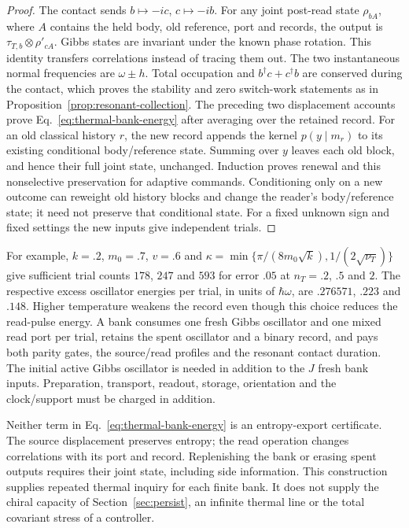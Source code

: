 \documentclass[aps,pre,onecolumn,superscriptaddress,floatfix,longbibliography]{revtex4-2}
\begin{document}
\begin{proof}
The contact sends $b\mapsto-ic$, $c\mapsto-ib$.
For any joint post-read state $\rho_{bA}$, where $A$ contains the held
body, old reference, port and records, the output is
$\tau_{T,b}\otimes\rho'_{cA}$. Gibbs states are invariant under the known
phase rotation. This identity transfers correlations instead of tracing
them out. The two instantaneous normal frequencies are $\omega\pm h$.
Total occupation and $b^\dagger c+c^\dagger b$ are conserved during the
contact, which proves the stability and zero switch-work statements as in
Proposition~\ref{prop:resonant-collection}. The preceding two displacement
accounts prove Eq.~\eqref{eq:thermal-bank-energy} after averaging over
the retained record. For an old classical history $r$, the new record
appends the kernel $p(y\mid m_r)$ to its existing conditional
body/reference state. Summing over $y$ leaves each old block, and hence
their full joint state, unchanged. Induction proves renewal and this
nonselective preservation for adaptive commands. Conditioning only on a
new outcome can reweight old history blocks and change the reader's
body/reference state; it need not preserve that conditional state.
For a fixed unknown sign and fixed settings the new inputs give
independent trials.
\end{proof}

For example, $k=.2$, $m_0=.7$, $v=.6$ and
$\kappa=\min\{\pi/(8m_0\sqrt{k}),1/(2\sqrt{\nu_T})\}$ give sufficient
trial counts $178$, $247$ and $593$ for error $.05$ at
$n_T=.2$, $.5$ and $2$. The respective excess oscillator energies per
trial, in units of $\hbar\omega$, are $.276571$, $.223$ and $.148$.
Higher temperature weakens the record even though this choice reduces
the read-pulse energy. A bank consumes one fresh Gibbs oscillator and one
mixed read port per trial, retains the spent oscillator and a binary
record, and pays both parity gates, the source/read profiles and the
resonant contact duration. The initial active Gibbs oscillator is needed
in addition to the $J$ fresh bank inputs. Preparation, transport, readout, storage,
orientation and the clock/support must be charged in addition.

Neither term in Eq.~\eqref{eq:thermal-bank-energy} is an entropy-export
certificate. The source displacement preserves entropy; the read operation
changes correlations with its port and record. Replenishing the bank or
erasing spent outputs requires their joint state, including side information.
This construction supplies repeated thermal inquiry for each finite bank.
It does not supply the chiral capacity of Section~\ref{sec:persist}, an
infinite thermal line or the total covariant stress of a controller.
\end{document}
